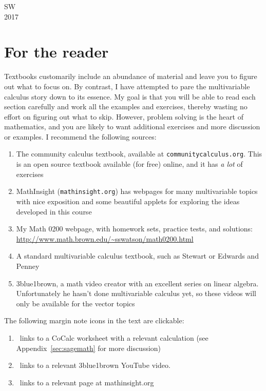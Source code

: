 \documentclass[svgnames]{report}
\begin{document}
SW \\
2017

\chapter*{For the reader}

Textbooks customarily include an abundance of material and leave you
to figure out what to focus on. By contrast, I have attempted to pare
the multivariable calculus story down to its essence. My goal is that
you will be able to read each section carefully and work all the
examples and exercises, thereby wasting no effort on figuring out what
to skip. However, problem solving is the heart of mathematics, and you
are likely to want additional exercises and more discussion or
examples. I recommend the following sources:
\begin{enumerate}[itemsep = 3pt] 
\item The community calculus textbook, available at
  \texttt{communitycalculus.org}. This is an open source textbook available (for
  free) online, and it has \textit{a lot} of exercises 
\item MathInsight (\texttt{mathinsight.org}) has webpages for many
  multivariable topics with nice exposition and some beautiful applets for exploring the
  ideas developed in this course
\item My Math 0200 webpage, with homework sets, practice tests, and
  solutions: \\
  \href{http://www.math.brown.edu/~sswatson/math0200.html}{\url{http://www.math.brown.edu/~sswatson/math0200.html}}
\item A standard multivariable calculus textbook, such as Stewart
  or Edwards and Penney
\item 3blue1brown, a math video creator with an excellent series on
  linear algebra. Unfortunately he hasn't done multivariable calculus
  yet, so these videos will only be available for the vector topics
 \end{enumerate}

The following margin note icons in the text are clickable:
\begin{enumerate}[itemsep=6pt, topsep = -6pt]
  \item \href{http://cocalc.com}{\cocalc}\,
links to a CoCalc worksheet with a relevant calculation (see Appendix~\ref{sec:sagemath} for more
discussion)
\item \href{http://3blue1brown.com}{\tbob} \, links to a relevant 3blue1brown YouTube video.
\item \href{http://mathinsight.org}{\mi} \, links to a relevant page at mathinsight.org
\end{enumerate}
\end{document}
